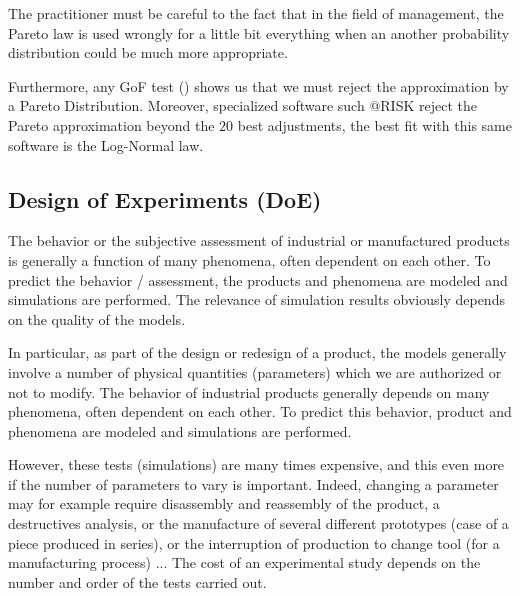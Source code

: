 	The practitioner must be careful to the fact that in the field of management, the Pareto law is used wrongly for a little bit everything when an another probability distribution could be much more appropriate.
	
	Furthermore, any GoF test () shows us that we must reject the approximation by a Pareto Distribution. Moreover, specialized software such @RISK reject the Pareto approximation beyond the $20$ best adjustments, the best fit with this same software is the Log-Normal law.
	
	\pagebreak
	\subsection{Design of Experiments (DoE)}\label{doe}
	The behavior or the subjective assessment of industrial or manufactured products is generally a function of many phenomena, often dependent on each other. To predict the behavior / assessment, the products and phenomena are modeled and simulations are performed. The relevance of simulation results obviously depends on the quality of the models.
	
	In particular, as part of the design or redesign of a product, the models generally involve a number of physical quantities (parameters) which we are authorized or not to modify. The behavior of industrial products generally depends on many phenomena, often dependent on each other. To predict this behavior, product and phenomena are modeled and simulations are performed.
	
	However, these tests (simulations) are many times expensive, and this even more if the number of parameters to vary is important. Indeed, changing a parameter may for example require disassembly and reassembly of the product, a destructives analysis, or the manufacture of several different prototypes (case of a piece produced in series), or the interruption of production to change tool (for a manufacturing process) ... The cost of an experimental study depends on the number and order of the tests carried out.


